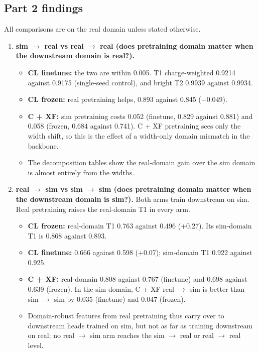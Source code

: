 \documentclass[10pt,a4paper]{article}
\begin{document}
\subsection{Part 2 findings}
All comparisons are on the real domain unless stated otherwise.

\begin{enumerate}
\item \textbf{sim $\rightarrow$ real vs real $\rightarrow$ real (does pretraining domain matter when the downstream domain is real?).}
\begin{itemize}
\item \textbf{CL finetune:} the two are within 0.005. T1 charge-weighted 0.9214 against 0.9175 (single-seed control), and bright T2 0.9939 against 0.9934.
\item \textbf{CL frozen:} real pretraining helps, 0.893 against 0.845 ($-$0.049).
\item \textbf{C + XF:} sim pretraining costs 0.052 (finetune, 0.829 against 0.881) and 0.058 (frozen, 0.684 against 0.741). C + XF pretraining sees only the width shift, so this is the effect of a width-only domain mismatch in the backbone.
\item The decomposition tables show the real-domain gain over the sim domain is almost entirely from the widths.
\end{itemize}
\item \textbf{real $\rightarrow$ sim vs sim $\rightarrow$ sim (does pretraining domain matter when the downstream domain is sim?).} Both arms train downstream on sim. Real pretraining raises the real-domain T1 in every arm.
\begin{itemize}
\item \textbf{CL frozen:} real-domain T1 0.763 against 0.496 (+0.27). Its sim-domain T1 is 0.868 against 0.893.
\item \textbf{CL finetune:} 0.666 against 0.598 (+0.07); sim-domain T1 0.922 against 0.925.
\item \textbf{C + XF:} real-domain 0.808 against 0.767 (finetune) and 0.698 against 0.639 (frozen). In the sim domain, C + XF real $\rightarrow$ sim is better than sim $\rightarrow$ sim by 0.035 (finetune) and 0.047 (frozen).
\item Domain-robust features from real pretraining thus carry over to downstream heads trained on sim, but not as far as training downstream on real: no real $\rightarrow$ sim arm reaches the sim $\rightarrow$ real or real $\rightarrow$ real level.
\end{itemize}

\end{enumerate}
\end{document}
